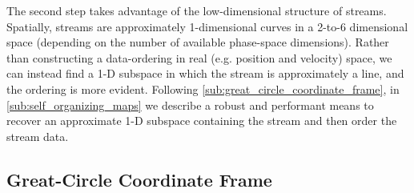 \documentclass[fleqn,usenatbib]{mnras}
\begin{document}
  The second step takes advantage of the low-dimensional structure of streams.
  Spatially, streams are approximately 1-dimensional curves in a 2-to-6
  dimensional space (depending on the number of available phase-space
  dimensions). Rather than constructing a data-ordering in real (e.g. position
  and velocity) space, we can instead find a 1-D subspace in which the stream is
  approximately a line, and the ordering is more evident. Following
  \autoref{sub:great_circle_coordinate_frame}, in
  \autoref{sub:self_organizing_maps} we describe a robust and performant means
  to recover an approximate 1-D subspace containing the stream and then order
  the stream data.

  \subsection{Great-Circle Coordinate Frame}
  \label{sub:great_circle_coordinate_frame}
\end{document}
